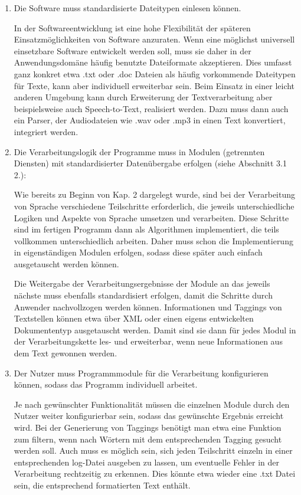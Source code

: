 \documentclass[12pt]{report}
\begin{document}
\begin{enumerate}
\item Die Software muss standardisierte Dateitypen einlesen können.

In der Softwareentwicklung ist eine hohe Flexibilität der späteren Einsatzmöglichkeiten von Software anzuraten. Wenn eine möglichst universell einsetzbare Software entwickelt werden soll, muss sie daher in der Anwendungsdomäne häufig benutzte Dateiformate akzeptieren. Dies umfasst ganz konkret etwa .txt oder .doc Dateien als häufig vorkommende Dateitypen für Texte, kann aber individuell erweiterbar sein. Beim Einsatz in einer leicht anderen Umgebung kann durch Erweiterung der Textverarbeitung aber beispielsweise auch Speech-to-Text, realisiert werden. Dazu muss dann auch ein Parser, der Audiodateien wie .wav oder .mp3  in einen Text konvertiert, integriert werden.

\item Die Verarbeitungslogik der Programme muss in Modulen (getrennten Diensten) mit standardisierter Datenübergabe erfolgen (siehe Abschnitt 3.1 2.): 

Wie bereits zu Beginn von Kap. 2 dargelegt wurde, sind bei der Verarbeitung von Sprache verschiedene Teilschritte erforderlich, die jeweils unterschiedliche Logiken und Aspekte von Sprache umsetzen und verarbeiten. Diese Schritte sind im fertigen Programm dann als Algorithmen implementiert, die teils vollkommen unterschiedlich arbeiten. Daher muss schon die Implementierung in eigenständigen Modulen erfolgen, sodass diese später auch einfach ausgetauscht werden können.

Die Weitergabe der Verarbeitungsergebnisse der Module an das jeweils nächste muss ebenfalls standardisiert erfolgen, damit die Schritte durch Anwender nachvollzogen werden können. Informationen und Taggings von Textstellen können etwa über XML oder einen eigens entwickelten Dokumententyp ausgetauscht werden. Damit sind sie dann für jedes Modul in der Verarbeitungskette les- und erweiterbar, wenn neue Informationen aus dem Text gewonnen werden.

\item Der Nutzer muss Programmmodule für die Verarbeitung konfigurieren können, sodass das Programm individuell arbeitet.

Je nach gewünschter Funktionalität müssen die einzelnen Module durch den Nutzer weiter konfigurierbar sein, sodass das gewünschte Ergebnis erreicht wird. Bei der Generierung von Taggings benötigt man etwa eine Funktion zum filtern, wenn nach Wörtern mit dem entsprechenden Tagging gesucht werden soll. Auch muss es möglich sein, sich jeden Teilschritt einzeln in einer entsprechenden log-Datei ausgeben zu lassen, um eventuelle Fehler in der Verarbeitung rechtzeitig zu erkennen. Dies könnte etwa wieder eine .txt Datei sein, die entsprechend formatierten Text enthält.


\end{enumerate}
\end{document}
